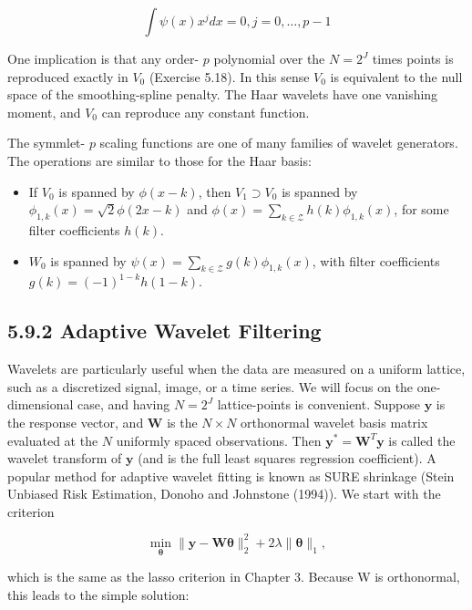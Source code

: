 \documentclass[10pt]{article}
\begin{document}
$$
\int \psi(x) x^{j} d x=0, j=0, \ldots, p-1
$$

One implication is that any order- $p$ polynomial over the $N=2^{J}$ times points is reproduced exactly in $V_{0}$ (Exercise 5.18). In this sense $V_{0}$ is equivalent to the null space of the smoothing-spline penalty. The Haar wavelets have one vanishing moment, and $V_{0}$ can reproduce any constant function.

The symmlet- $p$ scaling functions are one of many families of wavelet generators. The operations are similar to those for the Haar basis:

\begin{itemize}
  \item If $V_{0}$ is spanned by $\phi(x-k)$, then $V_{1} \supset V_{0}$ is spanned by $\phi_{1, k}(x)= \sqrt{2} \phi(2 x-k)$ and $\phi(x)=\sum_{k \in \mathcal{Z}} h(k) \phi_{1, k}(x)$, for some filter coefficients $h(k)$.
  \item $W_{0}$ is spanned by $\psi(x)=\sum_{k \in \mathcal{Z}} g(k) \phi_{1, k}(x)$, with filter coefficients $g(k)=(-1)^{1-k} h(1-k)$.
\end{itemize}

\subsection*{5.9.2 Adaptive Wavelet Filtering}
Wavelets are particularly useful when the data are measured on a uniform lattice, such as a discretized signal, image, or a time series. We will focus on the one-dimensional case, and having $N=2^{J}$ lattice-points is convenient. Suppose $\mathbf{y}$ is the response vector, and $\mathbf{W}$ is the $N \times N$ orthonormal wavelet basis matrix evaluated at the $N$ uniformly spaced observations. Then $\mathbf{y}^{*}= \mathbf{W}^{T} \mathbf{y}$ is called the wavelet transform of $\mathbf{y}$ (and is the full least squares regression coefficient). A popular method for adaptive wavelet fitting is known as SURE shrinkage (Stein Unbiased Risk Estimation, Donoho and Johnstone (1994)). We start with the criterion


\begin{equation*}
\min _{\boldsymbol{\theta}}\|\mathbf{y}-\mathbf{W} \boldsymbol{\theta}\|_{2}^{2}+2 \lambda\|\boldsymbol{\theta}\|_{1}, \tag{5.68}
\end{equation*}


which is the same as the lasso criterion in Chapter 3. Because W is orthonormal, this leads to the simple solution:
\end{document}
